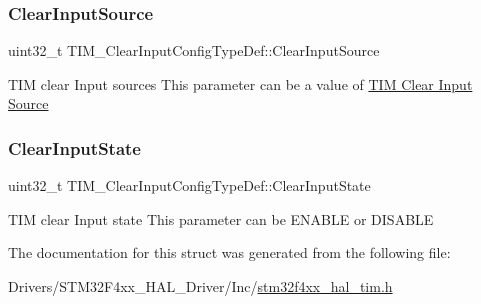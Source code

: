 \subsubsection{\texorpdfstring{Clear\+Input\+Source}{ClearInputSource}}
{\footnotesize\ttfamily uint32\+\_\+t T\+I\+M\+\_\+\+Clear\+Input\+Config\+Type\+Def\+::\+Clear\+Input\+Source}

T\+IM clear Input sources This parameter can be a value of \hyperlink{group___t_i_m___clear_input___source}{T\+IM Clear Input Source} \mbox{\label{struct_t_i_m___clear_input_config_type_def_a01d4b91dd297c4f0582a4d9179abf32f}} 
\subsubsection{\texorpdfstring{Clear\+Input\+State}{ClearInputState}}
{\footnotesize\ttfamily uint32\+\_\+t T\+I\+M\+\_\+\+Clear\+Input\+Config\+Type\+Def\+::\+Clear\+Input\+State}

T\+IM clear Input state This parameter can be E\+N\+A\+B\+LE or D\+I\+S\+A\+B\+LE 

The documentation for this struct was generated from the following file\+:\begin{DoxyCompactItemize}
\item 
Drivers/\+S\+T\+M32\+F4xx\+\_\+\+H\+A\+L\+\_\+\+Driver/\+Inc/\hyperlink{stm32f4xx__hal__tim_8h}{stm32f4xx\+\_\+hal\+\_\+tim.\+h}\end{DoxyCompactItemize}
